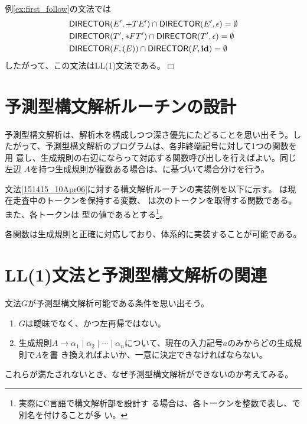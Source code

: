 \begin{example}
 例\ref{ex:first_follow}の文法では
 \begin{align*}
  & {\sf DIRECTOR}(E', +TE') \cap {\sf DIRECTOR}(E', \epsilon) = \emptyset \\
  & {\sf DIRECTOR}(T', *FT') \cap {\sf DIRECTOR}(T', \epsilon) = \emptyset \\
  & {\sf DIRECTOR}(F, (E)) \cap {\sf DIRECTOR}(F, {\bf id}) = \emptyset
 \end{align*}
 したがって、この文法はLL(1)文法である。$\Box$
\end{example}

\section{予測型構文解析ルーチンの設計}

予測型構文解析は、解析木を構成しつつ深さ優先にたどることを思い出そう。し
たがって、予測型構文解析のプログラムは、各非終端記号に対して1つの関数を用
意し、生成規則の右辺にならって対応する関数呼び出しを行えばよい。同じ左辺
$A$を持つ生成規則が複数ある場合は、\Director に基づいて場合分けを行う。

文法\eqref{151415_10Apr06}に対する構文解析ルーチンの実装例を以下に示す。
は現在走査中のトークンを保持する変数、
は次のトークンを取得する関数である。また、各トークンは
型の値であるとする\footnote{実際にC言語で構文解析部を設計す
る場合は、各トークンを整数で表し、で別名を付けることが多
い。}。

各関数は生成規則と正確に対応しており、体系的に実装することが可能である。

\begin{quote}

\end{quote}

\section{LL(1)文法と予測型構文解析の関連}

文法$G$が予測型構文解析可能である条件を思い出そう。
\begin{enumerate}
 \item $G$は曖昧でなく、かつ左再帰ではない。
 \item 生成規則$A \rightarrow \alpha_1 \mid \alpha_2 \mid \cdots \mid
       \alpha_n $について、現在の入力記号$a$のみからどの生成規則で$A$を書
       き換えればよいか、一意に決定できなければならない。
       \label{172929_31Mar06}
\end{enumerate}
これらが満たされないとき、なぜ予測型構文解析ができないのか考えてみる。

